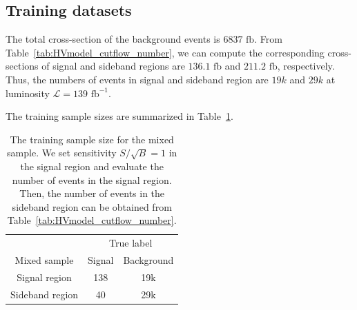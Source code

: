 \documentclass[12pt]{article}
\begin{document}
	\subsection{Training datasets}%
	\label{sub:training_datasets}
		The total cross-section of the background events is $6837 \text{ fb}$. From Table~\ref{tab:HVmodel_cutflow_number}, we can compute the corresponding cross-sections of signal and sideband regions are $136.1 \text{ fb}$ and $211.2 \text{ fb}$, respectively. Thus, the numbers of events in signal and sideband region are $19k$ and $29k$ at luminosity $\mathcal{L} = 139 \text{ fb}^{-1}$.

		The training sample sizes are summarized in Table~\ref{tab:training_sample_size_cwola_hunting_hv}.
		\begin{table}[htpb]
			\centering
			\caption{The training sample size for the mixed sample. We set sensitivity $S / \sqrt{B} = 1$ in the signal region and evaluate the number of events in the signal region. Then, the number of events in the sideband region can be obtained from Table~\ref{tab:HVmodel_cutflow_number}.}
			\label{tab:training_sample_size_cwola_hunting_hv}
			\begin{tabular}{c|cc}
								& \multicolumn{2}{c}{True label} \\
				Mixed sample    & Signal       & Background      \\ \hline
				Signal region   & 138          & 19k             \\
				Sideband region & 40           & 29k
			\end{tabular}
		\end{table}	
\end{document}

